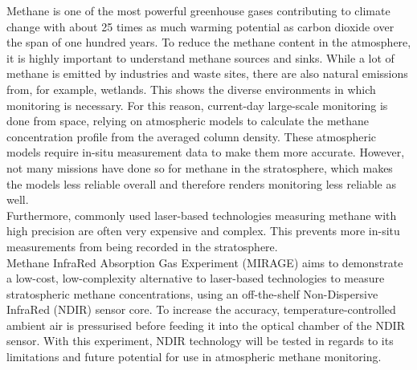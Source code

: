 
Methane is one of the most powerful greenhouse gases contributing to climate change with about 25 times as much warming potential as carbon dioxide over the span of one hundred years. To reduce the methane content in the atmosphere, it is highly important to understand methane sources and sinks. While a lot of methane is emitted by industries and waste sites, there are also natural emissions from, for example, wetlands. This shows the diverse environments in which monitoring is necessary. For this reason, current-day large-scale monitoring is done from space, relying on atmospheric models to calculate the methane concentration profile from the averaged column density. These atmospheric models require in-situ measurement data to make them more accurate. However, not many missions have done so for methane in the stratosphere, which makes the models less reliable overall and therefore renders monitoring less reliable as well. \\
Furthermore, commonly used laser-based technologies measuring methane with high precision are often very expensive and complex. This prevents more in-situ measurements from being recorded in the stratosphere.\\  
Methane InfraRed Absorption Gas Experiment (MIRAGE) aims to demonstrate a low-cost, low-complexity alternative to laser-based technologies to measure stratospheric methane concentrations, using an off-the-shelf Non-Dispersive InfraRed (NDIR) sensor core. To increase the accuracy, temperature-controlled ambient air is pressurised before feeding it into the optical chamber of the NDIR sensor. With this experiment, NDIR technology will be tested in regards to its limitations and future potential for use in atmospheric methane monitoring.


